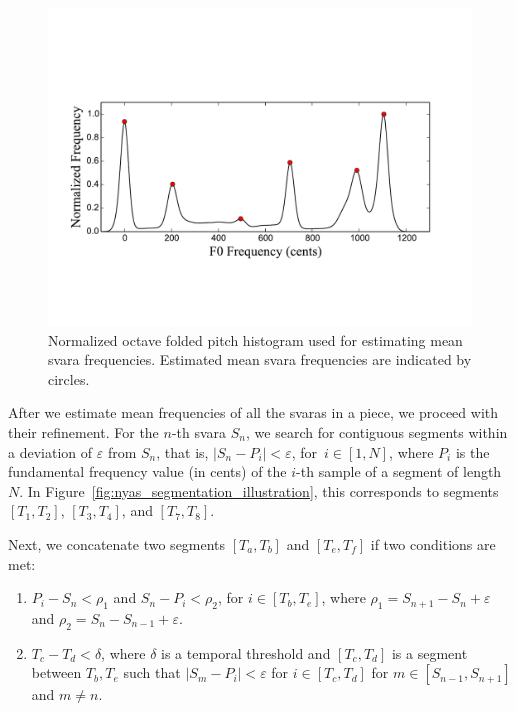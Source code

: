 {\begin{figure}
	\begin{center}
		\includegraphics[width=\figSizeNinety]{ch05_preprocessing/figures/swarOnHistogramForNyasSegmentation.pdf}
	\end{center}
	\caption{Normalized octave folded pitch histogram used for estimating mean \gls{svara} frequencies. Estimated mean \gls{svara} frequencies are indicated by circles.}
	\label{fig:pitch_histogram_nyas_segmentation}
\end{figure}

After we estimate mean frequencies of all the \glspl{svara} in a piece, we proceed with their refinement. For the $n$-th \gls{svara} $S_n$, we search for contiguous segments within a deviation of $\varepsilon$ from $S_n$, that is, $\vert S_n-P_i \vert < \varepsilon$, for~$i\in[1,N]$, where $P_i$ is the fundamental frequency value (in cents) of the $i$-th sample of a segment of length $N$. In Figure~\ref{fig:nyas_segmentation_illustration}, this corresponds to segments $[T_1,T_2]$, $[T_3,T_4]$, and $[T_7,T_8]$.

Next, we concatenate two segments $[T_a,T_b]$ and $[T_e,T_f]$ if two conditions are met:
\begin{enumerate}
	\item $P_i-S_n < \rho_1$ and $S_n-P_i < \rho_2$, for $i\in[T_b,T_e]$, where $\rho_1 = S_{n+1}-S_n + \varepsilon$ and $\rho_2 = S_n-S_{n-1} + \varepsilon$. 
	\item $T_c-T_d < \delta$, where $\delta$ is a temporal threshold and $[T_c,T_d]$ is a segment between $T_b, T_e$ such that $\vert S_m-P_i\vert <\varepsilon$ for $i\in[T_c,T_d]$ for $m\in [S_{n-1}, S_{n+1}]$ and $m \neq n$.
\end{enumerate}

}
